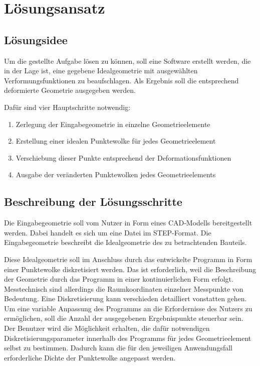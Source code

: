 \section{Lösungsansatz}

\subsection{Lösungsidee}

Um die gestellte Aufgabe lösen zu können, soll eine Software erstellt werden, die in der Lage ist, eine gegebene Idealgeometrie mit ausgewählten Verformungsfunktionen zu beaufschlagen. Als Ergebnis soll die entsprechend deformierte Geometrie ausgegeben werden. 

Dafür sind vier Hauptschritte notwendig: 

\begin{enumerate}
	\item Zerlegung der Eingabegeometrie in einzelne Geometrieelemente
	\item Erstellung einer idealen Punktewolke für jedes Geometrieelement
	\item Verschiebung dieser Punkte entsprechend der Deformationsfunktionen
	\item Ausgabe der veränderten Punktewolken jedes Geometrieelements 
\end{enumerate}

\subsection{Beschreibung der Lösungsschritte}

Die Eingabegeometrie soll vom Nutzer in Form eines CAD-Modells bereitgestellt werden. Dabei handelt es sich um eine Datei im STEP-Format. Die Eingabegeometrie beschreibt die Idealgeometrie des zu betrachtenden Bauteils.

Diese Idealgeometrie soll im Anschluss durch das entwickelte Programm in Form einer Punktewolke diskretisiert werden. Das ist erforderlich, weil die Beschreibung der Geometrie durch das Programm in einer kontinuierlichen Form erfolgt. Messtechnisch sind allerdings die Raumkoordinaten einzelner Messpunkte von Bedeutung. Eine Diskretisierung kann verschieden detailliert vonstatten gehen. Um eine variable Anpassung des Programms an die Erfordernisse des Nutzers zu ermöglichen, soll die Anzahl der ausgegebenen Ergebnispunkte steuerbar sein. Der Benutzer wird die Möglichkeit erhalten, die dafür notwendigen Diskretisierungsparameter innerhalb des Programms für jedes Geometrieelement selbst zu bestimmen. Dadurch kann die für den jeweiligen Anwendungsfall erforderliche Dichte der Punktewolke angepasst werden.

